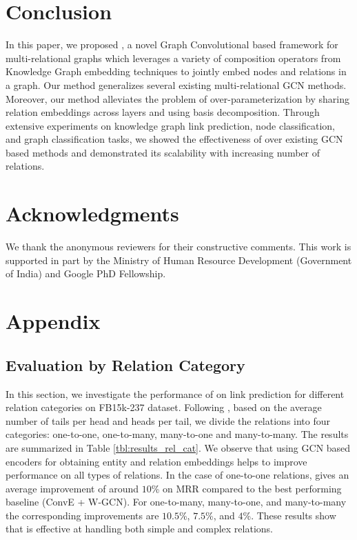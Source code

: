 \documentclass{article} \usepackage{iclr2020_conference,times}
\begin{document}
\section{Conclusion}
\label{sec:conclusion}
\vspace{-1mm}

In this paper, we proposed \method{}, a novel Graph Convolutional based framework for multi-relational graphs which leverages a variety of composition operators from Knowledge Graph embedding techniques to jointly embed nodes and relations in a  graph. Our method generalizes several existing multi-relational GCN methods. Moreover, our method alleviates the problem of over-parameterization by sharing relation embeddings across layers and using basis decomposition. Through extensive experiments on knowledge graph link prediction, node classification, and graph classification tasks, we showed the effectiveness of \method{} over existing GCN based methods and demonstrated its scalability with increasing number of relations.
 
\section*{Acknowledgments}
We thank the anonymous reviewers for their constructive comments. This work is supported in part by the Ministry of Human Resource Development (Government of India) and Google PhD Fellowship.





\newpage
\appendix
\section{Appendix}


\subsection{Evaluation by Relation Category}
\label{sec:results_rel_cat}
In this section, we investigate the performance of \method{} on link prediction for different relation categories on FB15k-237 dataset. Following \citet{kg_relation_cat,rotate}, based on the average number of tails per head and heads per tail, we divide the relations into four categories: one-to-one, one-to-many, many-to-one and many-to-many. The results are summarized in Table \ref{tbl:results_rel_cat}. We observe that using GCN based encoders for obtaining entity and relation embeddings helps to improve performance on all types of relations. In the case of one-to-one relations, \method{} gives an average improvement of around $10$\% on MRR compared to the best performing baseline (ConvE + W-GCN). For one-to-many, many-to-one, and many-to-many the corresponding improvements are $10.5$\%, $7.5$\%, and $4$\%. These results show that \method{} is effective at handling both simple and complex relations.
\end{document}
